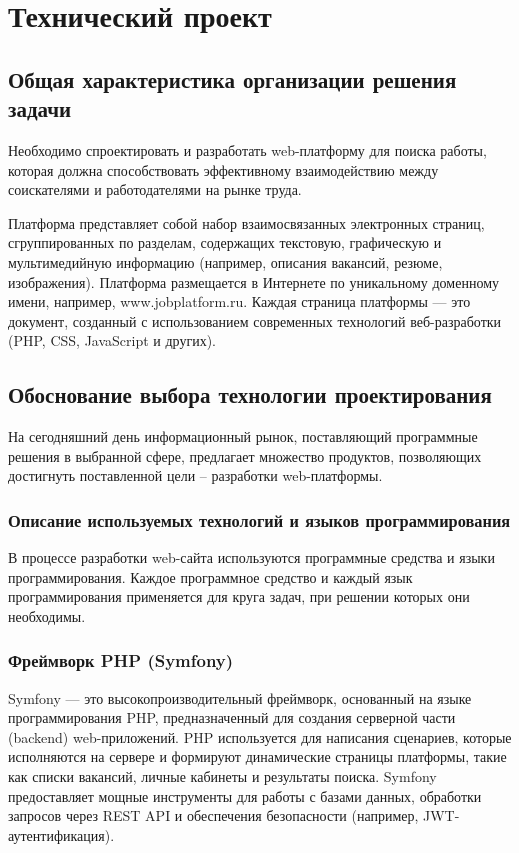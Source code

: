 \section{Технический проект}
\subsection{Общая характеристика организации решения задачи}

Необходимо спроектировать и разработать web-платформу для поиска работы, которая должна способствовать эффективному взаимодействию между соискателями и работодателями на рынке труда.

Платформа представляет собой набор взаимосвязанных электронных страниц, сгруппированных по разделам, содержащих текстовую, графическую и мультимедийную информацию (например, описания вакансий, резюме, изображения). Платформа размещается в Интернете по уникальному доменному имени, например, www.jobplatform.ru. Каждая страница платформы — это документ, созданный с использованием современных технологий веб-разработки (PHP, CSS, JavaScript и других).

\subsection{Обоснование выбора технологии проектирования}

На сегодняшний день информационный рынок, поставляющий программные решения в выбранной сфере, предлагает множество продуктов, позволяющих достигнуть поставленной цели – разработки web-платформы.

\subsubsection{Описание используемых технологий и языков программирования}

В процессе разработки web-сайта используются программные средства и языки программирования. Каждое программное средство и каждый язык программирования применяется для круга задач, при решении которых они необходимы.

\subsubsection{Фреймворк PHP (Symfony)}

Symfony — это высокопроизводительный фреймворк, основанный на языке программирования PHP, предназначенный для создания серверной части (backend) web-приложений. PHP используется для написания сценариев, которые исполняются на сервере и формируют динамические страницы платформы, такие как списки вакансий, личные кабинеты и результаты поиска. Symfony предоставляет мощные инструменты для работы с базами данных, обработки запросов через REST API и обеспечения безопасности (например, JWT-аутентификация).

